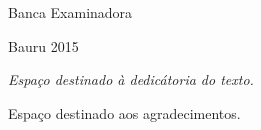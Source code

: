 \documentclass[
	12pt,				%
	openright,			%
	oneside,			%
	a4paper,			%
	english,			%
	french,				%
	spanish,			%
	brazil				%
	]{abntex2}
\begin{document}

%
% 
%
\begin{folhadeaprovacao}

  \begin{center}
    {\ABNTEXchapterfont\large\imprimirautor}

    \vspace*{\fill}\vspace*{\fill}
    \begin{center}
      \ABNTEXchapterfont\bfseries\Large\imprimirtitulo
    \end{center}
    \vspace*{\fill}

    \hspace{.45\textwidth}
    \begin{minipage}{.5\textwidth}
        \imprimirpreambulo
    \end{minipage}%
    \vspace*{\fill}
   \end{center}

   \center Banca Examinadora


   \begin{center}
    \vspace*{0.5cm}
    \par
    {Bauru}
    {2015}
    \vspace*{1cm}
  \end{center}

\end{folhadeaprovacao}

\begin{dedicatoria}
   \vspace*{\fill}
   \centering
   \noindent
   \textit{Espaço destinado à dedicátoria do texto.} \vspace*{\fill}
\end{dedicatoria}

\begin{agradecimentos}
Espaço destinado aos agradecimentos.
\end{agradecimentos}
\end{document}
